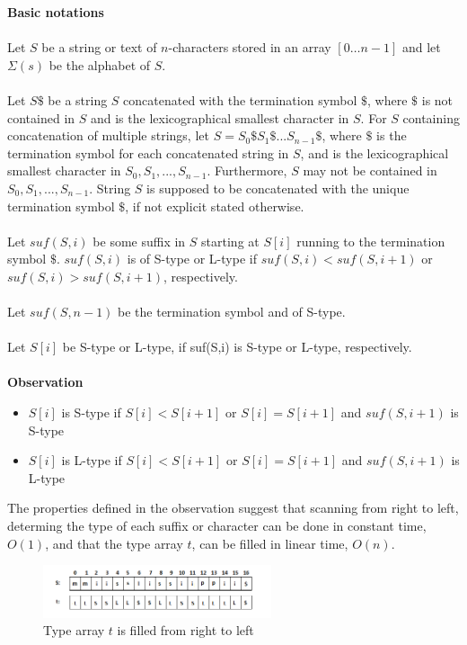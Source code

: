 \documentclass[12pt]{article} %
\begin{document}
\textbf{Basic notations}
\\ \\
Let $S$ be a string or text of $n$-characters stored in an array $[0…n-1]$ and let $\Sigma(s)$ be the alphabet of $S$. 
\\ \\
Let $S$$\$$ be a string $S$ concatenated with the termination symbol $\$$, where $\$$ is not contained in $S$ and is the lexicographical smallest character in $S$. For $S$ containing concatenation of multiple strings, let $S={S_0\$S_1\$...S_{n-1}\$}$, where $\$$ is the termination symbol for each concatenated string in $S$, and is the lexicographical smallest character in $S_0,S_1,...,S_{n-1}$. Furthermore, $S$ may not be contained in $S_0,S_1,...,S_{n-1}$. String $S$ is supposed to be concatenated with the unique termination symbol $\$$, if not explicit   stated otherwise.
\\ \\
Let $suf(S,i)$ be some suffix in $S$ starting at $S[i]$ running to the termination symbol $\$$. $suf(S,i)$ is of S-type or L-type if $suf(S,i) < suf(S,i+1)$ or $suf(S,i) > suf(S,i+1)$, respectively.
\\ \\
Let $suf(S, n-1)$ be the termination symbol and of S-type.
\\ \\
Let $S[i]$ be S-type or L-type, if suf(S,i) is S-type or L-type, respectively.
\\ \\
\textbf{Observation}
\begin{itemize}
  \item $S[i]$ is  S-type if $S[i] < S[i+1]$ or $S[i] = S[i+1]$ and $suf(S, i+1)$ is S-type
  \item $S[i]$ is  L-type if $S[i] < S[i+1]$ or $S[i] = S[i+1]$ and $suf(S, i+1)$ is L-type
\end{itemize}

The properties defined in the observation suggest that scanning from right to left, determing the type of each suffix or character can be done in constant time, $O(1)$, and that the type array $t$, can be filled in linear time, $O(n)$.

\begin{figure}[H]
    \centering
    \includegraphics[width=0.6\textwidth]{SAISmmii1}
    \captionsetup{width=0.8\textwidth}
    \caption{Type array $t$ is filled from right to left}
    \label{fig:SAISmmii1}
\end{figure}
\end{document}
